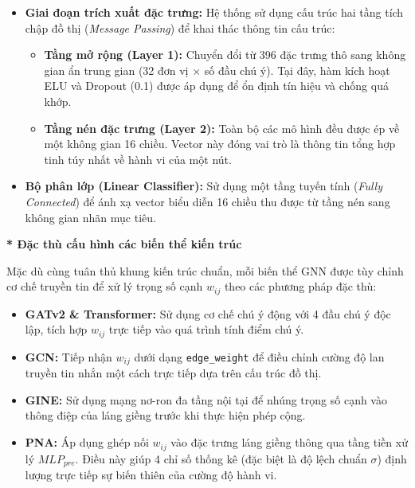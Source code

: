 \begin{itemize}[label={--}, itemsep=1pt]
    \item \textbf{Giai đoạn trích xuất đặc trưng:} Hệ thống sử dụng cấu trúc hai tầng tích chập đồ thị (\textit{Message Passing}) để khai thác thông tin cấu trúc:
    \begin{itemize}[label={+}, itemsep=1pt]
        \item \textbf{Tầng mở rộng (Layer 1):} Chuyển đổi từ 396 đặc trưng thô sang không gian ẩn trung gian (32 đơn vị × số đầu chú ý). Tại đây, hàm kích hoạt ELU và Dropout (0.1) được áp dụng để ổn định tín hiệu và chống quá khớp.
        \item \textbf{Tầng nén đặc trưng (Layer 2):} Toàn bộ các mô hình đều được ép về một không gian 16 chiều. Vector này đóng vai trò là thông tin tổng hợp tinh túy nhất về hành vi của một nút.
    \end{itemize}
    \item \textbf{Bộ phân lớp (Linear Classifier):} Sử dụng một tầng tuyến tính (\textit{Fully Connected}) để ánh xạ vector biểu diễn 16 chiều thu được từ tầng nén sang không gian nhãn mục tiêu.
\end{itemize}

\textbf{* Đặc thù cấu hình các biến thể kiến trúc}\vspace{0.2cm}

\indent Mặc dù cùng tuân thủ khung kiến trúc chuẩn, mỗi biến thể GNN được tùy chỉnh cơ chế truyền tin để xử lý trọng số cạnh $w_{ij}$ theo các phương pháp đặc thù:
\begin{itemize}[label={--}, itemsep=1pt]
    \item \textbf{GATv2 \& Transformer:} Sử dụng cơ chế chú ý động với 4 đầu chú ý độc lập, tích hợp $w_{ij}$ trực tiếp vào quá trình tính điểm chú ý.
    \item \textbf{GCN:} Tiếp nhận $w_{ij}$ dưới dạng \texttt{edge\_weight} để điều chỉnh cường độ lan truyền tin nhắn một cách trực tiếp dựa trên cấu trúc đồ thị.
    \item \textbf{GINE:} Sử dụng mạng nơ-ron đa tầng nội tại để nhúng trọng số cạnh vào thông điệp của láng giềng trước khi thực hiện phép cộng.
    \item \textbf{PNA:} Áp dụng ghép nối $w_{ij}$ vào đặc trưng láng giềng thông qua tầng tiền xử lý $MLP_{pre}$. Điều này giúp 4 chỉ số thống kê (đặc biệt là độ lệch chuẩn $\sigma$) định lượng trực tiếp sự biến thiên của cường độ hành vi.
\end{itemize}

